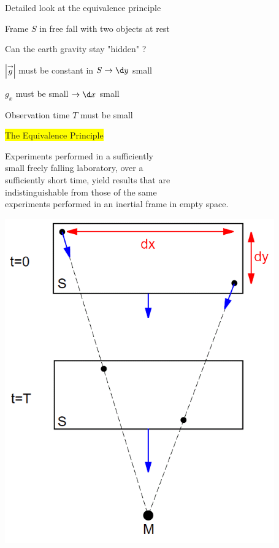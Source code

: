 \Tr
{}
\begin{itemize}
\item Detailed look at the equivalence principle
\item[] Frame $S$ in free fall with two objects at rest
\item[$\ast$] {\red Can the earth gravity stay "hidden" ?}
\item[] $|\vec{g}|$ must be constant in $S \rightarrow \d y$ small
\item[] $g_{x}$ must be small $\rightarrow \d x$ small
\item[] Observation time $T$ must be small
\item[] \begin{center}\colorbox{yellow}{The Equivalence Principle}\end{center}
{\red
\item[] Experiments performed in a sufficiently\\
        small freely falling laboratory, over a\\
        sufficiently short time, yield results that are\\
        indistinguishable from those of the same\\
        experiments performed in an inertial frame in empty space.
}
\end{itemize}

\newpage

\begin{center}
\includegraphics[keepaspectratio,height=14cm]{equivalence2}
\end{center}


